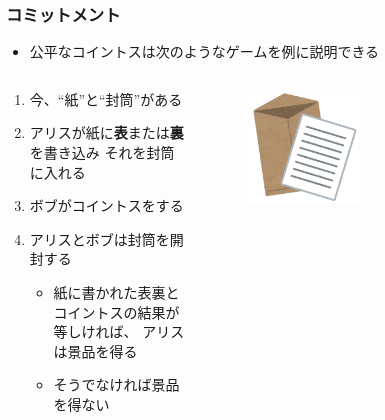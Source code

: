 \begin{frame}
  \frametitle{コミットメント}

  \begin{itemize}
    \item 公平なコイントスは次のようなゲームを例に説明できる
  \end{itemize}

  \begin{exampleblock}{}
    \begin{columns}
      \begin{column}{0.8\textwidth}
        \begin{enumerate}
          \item 今、``紙''と``封筒''がある
          \item アリスが紙に\textbf{表}または\textbf{裏}を書き込み
          それを封筒に入れる
          \item ボブがコイントスをする
          \item アリスとボブは封筒を開封する
          \begin{itemize}
            \item 紙に書かれた表裏とコイントスの結果が等しければ、
            アリスは景品を得る
            \item そうでなければ景品を得ない
          \end{itemize}
        \end{enumerate}
      \end{column}
      \begin{column}{0.2\textwidth}
        \begin{center}
          \begin{figure}[h]
            \includegraphics[width=0.5\textwidth]{img/document_syorui_fuutou.png}
          \end{figure}
          \begin{figure}[h]

\end{figure}
\end{center}
\end{column}
\end{columns}
\end{exampleblock}
\end{frame}
